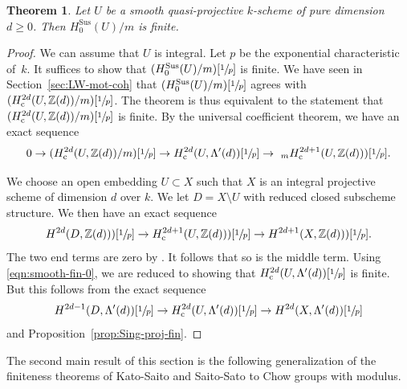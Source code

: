 \documentclass[JEP,XML,SOM,Unicode,published]{cedram}
\let\ra\rightarrow
\newcommand{\rc}{\mathrm{c}}
\newcommand{\sus}{\mathrm{Sus}}
\newtheorem{thm}{Theorem}[section]
\theoremstyle{definition}
\newcommand{\propref}{Proposition~\ref}
\newcommand{\secref}{Section~\ref}
\newcommand{\Z}{{\mathbb Z}}
\begin{document}
\begin{thm}\label{thm:smooth-fin}
Let $U$ be a smooth quasi-projective $k$-scheme of pure dimension $d \ge 0$.
Then ${H^{\sus}_0(U)}/m$ is finite.
\end{thm}
\begin{proof}
We can assume that $U$ is integral.
Let $p$ be the exponential characteristic of~$k$.
It suffices to show that $({H^{\sus}_0(U)}/m)[\sfrac{1}{p}]$ is finite.
We have seen in \secref{sec:LW-mot-coh} that
$({H^{\sus}_0(U)}/m)[\sfrac{1}{p}]$ agrees with
$({H^{2d}_\rc(U, \Z(d))}/m)[\sfrac{1}{p}]$.
The theorem is thus equivalent to the statement that
$({H^{2d}_\rc(U, \Z(d))}/m)[\sfrac{1}{p}]$ is finite.
By the universal coefficient theorem, we have an exact sequence
\begin{equation}\label{eqn:smooth-fin-0}
0 \ra ({H^{2d}_\rc(U, \Z(d))}/m)[\sfrac{1}{p}]
\ra H^{2d}_\rc(U, \Lambda'(d))[\sfrac{1}{p}] \ra~_mH^{2d+1}_\rc(U, \Z(d)))[\sfrac{1}{p}].
\end{equation}

We choose an open embedding $U \subset X$ such that $X$ is an integral
projective scheme of dimension $d$ over $k$. We let $D = X \setminus U$
with reduced closed subscheme structure.
We then have an exact sequence
\[
H^{2d}(D, \Z(d)))[\sfrac{1}{p}] \to H^{2d+1}_\rc(U, \Z(d)))[\sfrac{1}{p}] \to
H^{2d+1}(X, \Z(d)))[\sfrac{1}{p}].
\]
The two end terms are zero by \cite[Th.\,5.1]{KP}. It follows that so is the
middle term. Using \eqref{eqn:smooth-fin-0},
we are reduced to showing that
$H^{2d}_\rc(U, \Lambda'(d))[\sfrac{1}{p}]$ is finite.
But this follows from the exact sequence
\[
H^{2d-1}(D, \Lambda'(d))[\sfrac{1}{p}] \to
H^{2d}_\rc(U, \Lambda'(d))[\sfrac{1}{p}] \to H^{2d}(X, \Lambda'(d))[\sfrac{1}{p}]
\]
and \propref{prop:Sing-proj-fin}.
\end{proof}

The second main result of this section is the following generalization of the
finiteness theorems of Kato-Saito \cite{Kato-Saito-1} and Saito-Sato
\cite{SaitoSatoAnnals} to Chow groups with modulus.
\end{document}
